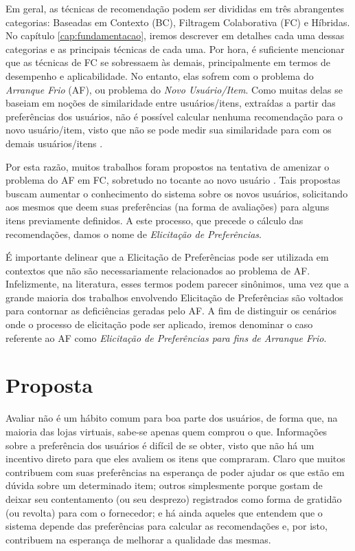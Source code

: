 
Em geral, as técnicas de recomendação podem ser divididas em três abrangentes categorias: Baseadas em Contexto (BC), Filtragem Colaborativa (FC) e Híbridas. No capítulo \ref{cap:fundamentacao}, iremos descrever em detalhes cada uma dessas categorias e as principais técnicas de cada uma. Por hora, é suficiente mencionar que as técnicas de FC se sobressaem às demais, principalmente em termos de desempenho e aplicabilidade. No entanto, elas sofrem com o problema do \textit{Arranque Frio} (AF), ou problema do \textit{Novo Usuário/Item}. Como muitas delas se baseiam em noções de similaridade entre usuários/itens, extraídas a partir das preferências dos usuários, não é possível calcular nenhuma recomendação para o novo usuário/item, visto que não se pode medir sua similaridade para com os demais usuários/itens \citep{su_survey_2009}.


Por esta razão, muitos trabalhos foram propostos na tentativa de amenizar o problema do AF em FC, sobretudo no tocante ao novo usuário \citep{Rashid:2002:GKY:502716.502737, Rashid:2008:LPN:1540276.1540302, elahi_rating_2011, elahi_system-wide_2011, Elahi:2014:ALS:2542182.2542195}. Tais propostas buscam aumentar o conhecimento do sistema sobre os novos usuários, solicitando aos mesmos que deem suas preferências (na forma de avaliações) para alguns itens previamente definidos. A este processo, que precede o cálculo das recomendações, damos o nome de \textit{Elicitação de Preferências}.

É importante delinear que a Elicitação de Preferências pode ser utilizada em contextos que não são necessariamente relacionados ao problema de AF. Infelizmente, na literatura, esses termos podem parecer sinônimos, uma vez que a grande maioria dos trabalhos envolvendo Elicitação de Preferências são voltados para contornar as deficiências geradas pelo AF. A fim de distinguir os cenários onde o processo de elicitação pode ser aplicado, iremos denominar o caso referente ao AF como \textit{Elicitação de Preferências para fins de Arranque Frio}.

\section{Proposta}

Avaliar não é um hábito comum para boa parte dos usuários, de forma que, na maioria das lojas virtuais, sabe-se apenas quem comprou o que. Informações sobre a preferência dos usuários é difícil de se obter, visto que não há um incentivo direto para que eles avaliem os itens que compraram. Claro que muitos contribuem com suas preferências na esperança de poder ajudar os que estão em dúvida sobre um determinado item; outros simplesmente porque gostam de deixar seu contentamento (ou seu desprezo) registrados como forma de gratidão (ou revolta) para com o fornecedor; e há ainda aqueles que entendem que o sistema depende das preferências para calcular as recomendações e, por isto, contribuem na esperança de melhorar a qualidade das mesmas.


